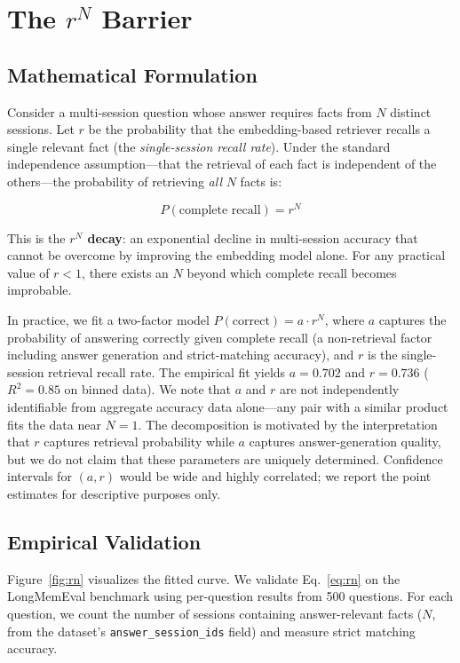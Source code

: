 \documentclass{article}
\begin{document}
\section{The $r^N$ Barrier}
\label{sec:rn}
\label{sec:rn}


\subsection{Mathematical Formulation}

Consider a multi-session question whose answer requires facts from $N$ distinct sessions. Let $r$ be the probability that the embedding-based retriever recalls a single relevant fact (the \emph{single-session recall rate}). Under the standard independence assumption—that the retrieval of each fact is independent of the others—the probability of retrieving \emph{all} $N$ facts is:

\begin{equation}
P(\text{complete recall}) = r^N
\label{eq:rn}
\end{equation}

This is the \textbf{$r^N$ decay}: an exponential decline in multi-session accuracy that cannot be overcome by improving the embedding model alone. For any practical value of $r < 1$, there exists an $N$ beyond which complete recall becomes improbable.

In practice, we fit a two-factor model $P(\text{correct}) = a \cdot r^N$, where $a$ captures the probability of answering correctly given complete recall (a non-retrieval factor including answer generation and strict-matching accuracy), and $r$ is the single-session retrieval recall rate. The empirical fit yields $a = 0.702$ and $r = 0.736$ ($R^2 = 0.85$ on binned data). We note that $a$ and $r$ are not independently identifiable from aggregate accuracy data alone---any pair with a similar product fits the data near $N=1$. The decomposition is motivated by the interpretation that $r$ captures retrieval probability while $a$ captures answer-generation quality, but we do not claim that these parameters are uniquely determined. Confidence intervals for $(a, r)$ would be wide and highly correlated; we report the point estimates for descriptive purposes only.

\subsection{Empirical Validation}

Figure~\ref{fig:rn} visualizes the fitted curve. We validate Eq.~\ref{eq:rn} on the LongMemEval benchmark using per-question results from 500 questions. For each question, we count the number of sessions containing answer-relevant facts ($N$, from the dataset's \texttt{answer\_session\_ids} field) and measure strict matching accuracy.
\end{document}
